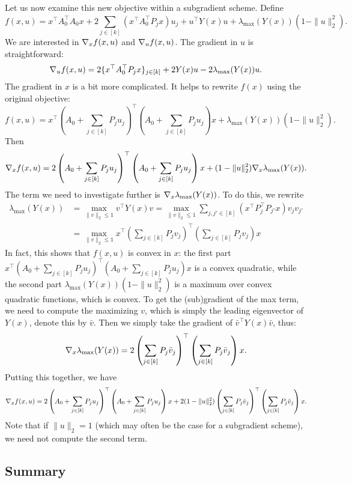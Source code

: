 \documentclass[11pt,oneside]{article}
\theoremstyle{plain}
\theoremstyle{definition}
\theoremstyle{remark}
\begin{document}
Let us now examine this new objective within a subgradient scheme. Define
\[ f(x,u) = x^\top A_0^\top A_0 x + 2 \sum_{j \in [k]} (x^\top A_0^\top P_j x) u_j + u^\top Y(x) u + \lambda_{\max}(Y(x))(1 - \|u\|_2^2). \]
We are interested in $\nabla_x f(x,u)$ and $\nabla_u f(x,u)$. The gradient in $u$ is straightforward:
\[ \nabla_u f(x,u) = 2 \{x^\top A_0^\top P_j x\}_{j \in [k]} + 2 Y(x) u - 2 \lambda_{\max}(Y(x)) u. \]
The gradient in $x$ is a bit more complicated. It helps to rewrite $f(x)$ using the original objective:
\[ f(x,u) = x^\top \left( A_0 + \sum_{j \in [k]} P_j u_j \right)^\top \left( A_0 + \sum_{j \in [k]} P_j u_j \right) x + \lambda_{\max}(Y(x))(1 - \|u\|_2^2). \]
Then
\[ \nabla_x f(x,u) = 2 \left( A_0 + \sum_{j \in [k]} P_j u_j \right)^\top \left( A_0 + \sum_{j \in [k]} P_j u_j \right) x + (1 - \|u\|_2^2) \nabla_x \lambda_{\max}(Y(x)). \]
The term we need to investigate further is $\nabla_x \lambda_{\max}(Y(x))$. To do this, we rewrite
\begin{align*}
\lambda_{\max}(Y(x)) &= \max_{\|v\|_2 \leq 1} v^\top Y(x) v = \max_{\|v\|_2 \leq 1} \sum_{j,j' \in [k]} \left(x^\top P_j^\top P_{j'} x\right) v_j v_{j'}\\
&= \max_{\|v\|_2 \leq 1} x^\top \left( \sum_{j \in [k]} P_j v_j \right)^\top \left( \sum_{j \in [k]} P_j v_j \right) x
\end{align*}
In fact, this shows that $f(x,u)$ is convex in $x$: the first part $x^\top \left( A_0 + \sum_{j \in [k]} P_j u_j \right)^\top \left( A_0 + \sum_{j \in [k]} P_j u_j \right) x$ is a convex quadratic, while the second part $\lambda_{\max}(Y(x))(1 - \|u\|_2^2)$ is a maximum over convex quadratic functions, which is convex. To get the (sub)gradient of the max term, we need to compute the maximizing $v$, which is simply the leading eigenvector of $Y(x)$, denote this by $\bar{v}$. Then we simply take the gradient of $\bar{v}^\top Y(x) \bar{v}$, thus:
\[ \nabla_x \lambda_{\max}(Y(x)) = 2 \left( \sum_{j \in [k]} P_j \bar{v}_j \right)^\top \left( \sum_{j \in [k]} P_j \bar{v}_j \right) x. \]
Putting this together, we have
\[ \nabla_x f(x,u) = 2 \left( A_0 + \sum_{j \in [k]} P_j u_j \right)^\top \left( A_0 + \sum_{j \in [k]} P_j u_j \right) x + 2 (1 - \|u\|_2^2) \left( \sum_{j \in [k]} P_j \bar{v}_j \right)^\top \left( \sum_{j \in [k]} P_j \bar{v}_j \right) x. \]
Note that if $\|u\|_2 = 1$ (which may often be the case for a subgradient scheme), we need not compute the second term.


\subsection{Summary}
\end{document}
